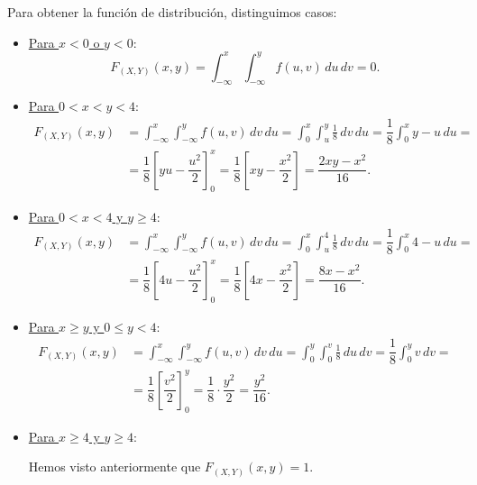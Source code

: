 \begin{ejercicio}
\begin{enumerate}
        Para obtener la función de distribución, distinguimos casos:
        \begin{itemize}
            \item \ul{Para $x< 0$ o $y< 0$}:
            \begin{equation*}
                F_{(X,Y)}(x, y) = \int_{-\infty}^x \int_{-\infty}^y f(u, v) \, du \, dv = 0.
            \end{equation*}

            \item \ul{Para $0 < x < y <4$}:
            \begin{align*}
                F_{(X,Y)}(x, y) &= \int_{-\infty}^x \int_{-\infty}^y f(u, v) \, dv \, du = \int_{0}^x \int_{u}^y \frac{1}{8} \, dv \, du = \dfrac{1}{8}\int_{0}^x y-u \, du =\\&= \dfrac{1}{8}\left[yu-\dfrac{u^2}{2}\right]_0^x = \dfrac{1}{8}\left[xy-\dfrac{x^2}{2}\right]
                = \dfrac{2xy-x^2}{16}.
            \end{align*}

            \item \ul{Para $0 < x < 4$ y $y \geq 4$}:
            \begin{align*}
                F_{(X,Y)}(x, y) &= \int_{-\infty}^x \int_{-\infty}^y f(u, v) \, dv \, du =
                \int_0^x \int_u^4 \frac{1}{8} \, dv \, du = \dfrac{1}{8}\int_0^x 4-u \, du =\\&= \dfrac{1}{8}\left[4u-\dfrac{u^2}{2}\right]_0^x = \dfrac{1}{8}\left[4x-\dfrac{x^2}{2}\right] = \dfrac{8x-x^2}{16}.
            \end{align*}

            \item \ul{Para $x\geq y$ y $0\leq y<4$}:
            \begin{align*}
                F_{(X,Y)}(x, y) &= \int_{-\infty}^x \int_{-\infty}^y f(u, v) \, dv \, du =
                \int_0^{y} \int_{0}^v \frac{1}{8} \, du \, dv = \dfrac{1}{8}\int_0^y v \, dv =\\&= \dfrac{1}{8}\left[\dfrac{v^2}{2}\right]_0^y = \dfrac{1}{8}\cdot \dfrac{y^2}{2} = \dfrac{y^2}{16}.
            \end{align*}

            \item \ul{Para $x \geq 4$ y $y \geq 4$}:
            
            Hemos visto anteriormente que $F_{(X,Y)}(x,y) = 1$.
        \end{itemize}


\end{enumerate}
\end{ejercicio}
